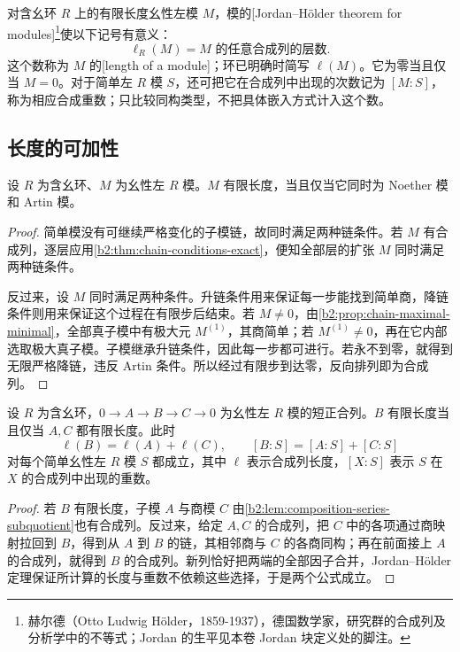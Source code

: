 对含幺环 \(R\) 上的有限长度幺性左模 \(M\)，模的[Jordan–Hölder theorem for modules]\footnote{赫尔德（Otto Ludwig Hölder，1859-1937），德国数学家，研究群的合成列及分析学中的不等式；Jordan 的生平见本卷 Jordan 块定义处的脚注。}使以下记号有意义：
\[
	\ell_R(M)=\text{\(M\) 的任意合成列的层数}.
\]
这个数称为 \(M\) 的[length of a module]；环已明确时简写 \(\ell(M)\)。它为零当且仅当 \(M=0\)。对于简单左 \(R\) 模 \(S\)，还可把它在合成列中出现的次数记为 \([M:S]\)，称为相应合成重数；只比较同构类型，不把具体嵌入方式计入这个数。

\subsection{长度的可加性}
\label{b2:subsec:1202:02}

\begin{theorem}\label{b2:thm:finite-length-chain-conditions}
	设 \(R\) 为含幺环、\(M\) 为幺性左 \(R\) 模。\(M\) 有限长度，当且仅当它同时为 Noether 模和 Artin 模。
\end{theorem}
\begin{proof}
	简单模没有可继续严格变化的子模链，故同时满足两种链条件。若 \(M\) 有合成列，逐层应用\cref{b2:thm:chain-conditions-exact}，便知全部层的扩张 \(M\) 同时满足两种链条件。

	反过来，设 \(M\) 同时满足两种条件。升链条件用来保证每一步能找到简单商，降链条件则用来保证这个过程在有限步后结束。若 \(M\ne0\)，由\cref{b2:prop:chain-maximal-minimal}，全部真子模中有极大元 \(M^{(1)}\)，其商简单；若 \(M^{(1)}\ne0\)，再在它内部选取极大真子模。子模继承升链条件，因此每一步都可进行。若永不到零，就得到无限严格降链，违反 Artin 条件。所以经过有限步到达零，反向排列即为合成列。
\end{proof}

\begin{proposition}[长度的可加性]\label{b2:prop:length-additive}
	设 \(R\) 为含幺环，\(0\rightarrow A\rightarrow B\rightarrow C\rightarrow0\) 为幺性左 \(R\) 模的短正合列。\(B\) 有限长度当且仅当 \(A,C\) 都有限长度。此时
	\[
		\ell(B)=\ell(A)+\ell(C),\qquad [B:S]=[A:S]+[C:S]
	\]
	对每个简单幺性左 \(R\) 模 \(S\) 都成立，其中 \(\ell\) 表示合成列长度，\([X:S]\) 表示 \(S\) 在 \(X\) 的合成列中出现的重数。
\end{proposition}
\begin{proof}
	若 \(B\) 有限长度，子模 \(A\) 与商模 \(C\) 由\cref{b2:lem:composition-series-subquotient}也有合成列。反过来，给定 \(A,C\) 的合成列，把 \(C\) 中的各项通过商映射拉回到 \(B\)，得到从 \(A\) 到 \(B\) 的链，其相邻商与 \(C\) 的各商同构；再在前面接上 \(A\) 的合成列，就得到 \(B\) 的合成列。新列恰好把两端的全部因子合并，Jordan–Hölder 定理保证所计算的长度与重数不依赖这些选择，于是两个公式成立。
\end{proof}

